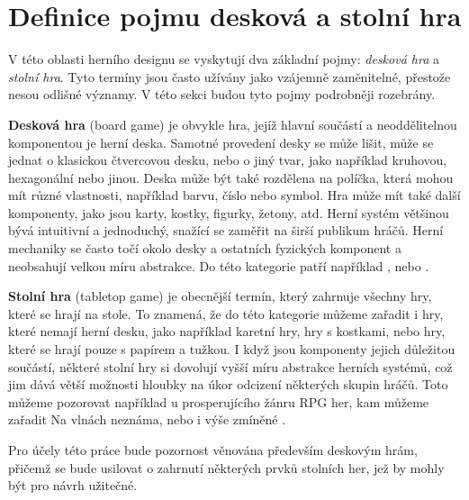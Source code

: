 \section{Definice pojmu desková a stolní hra}
\label{subsec:boardgame_definition}

V této oblasti herního designu se vyskytují dva základní pojmy: \textit{desková hra} a \textit{stolní hra}. Tyto termíny jsou často užívány jako vzájemně zaměnitelné, přestože nesou odlišné významy. V této sekci budou tyto pojmy podrobněji rozebrány.

\textbf{Desková hra} (board game) je obvykle hra, jejíž hlavní součástí a neoddělitelnou komponentou je herní deska. Samotné provedení desky se může lišit, může se jednat o klasickou čtvercovou desku, nebo o jiný tvar, jako například kruhovou, hexagonální nebo jinou. Deska může být také rozdělena na políčka, která mohou mít různé vlastnosti, například barvu, číslo nebo symbol. Hra může mít také další komponenty, jako jsou karty, kostky, figurky, žetony, atd. Herní systém většinou bývá intuitivní a jednoduchý, snažící se zaměřit na širší publikum hráčů. Herní mechaniky se často točí okolo desky a ostatních fyzických komponent a neobsahují velkou míru abstrakce. Do této kategorie patří například ,  nebo . \cite{board_game_supply_2023}

\textbf{Stolní hra} (tabletop game) je obecnější termín, který zahrnuje všechny hry, které se hrají na stole. To znamená, že do této kategorie můžeme zařadit i hry, které nemají herní desku, jako například karetní hry, hry s kostkami, nebo hry, které se hrají pouze s papírem a tužkou. I když jsou komponenty jejich důležitou součástí, některé stolní hry si dovolují vyšší míru abstrakce herních systémů, což jim dává větší možnosti hloubky na úkor odcizení některých skupin hráčů. Toto můžeme pozorovat například u prosperujícího žánru RPG her, kam můžeme zařadit Na vlnách neznáma,  nebo i výše zmíněné . \cite{board_game_supply_2023}

Pro účely této práce bude pozornost věnována především deskovým hrám, přičemž se bude usilovat o zahrnutí některých prvků stolních her, jež by mohly být pro návrh užitečné.
